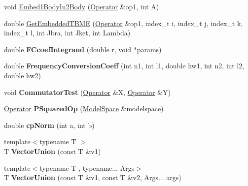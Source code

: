 \begin{DoxyCompactItemize}
\item 
void \hyperlink{namespaceimsrg__util_a4401971760847346e50bbfef08939f1e}{Embed1\+Body\+In2\+Body} (\hyperlink{classOperator}{Operator} \&op1, int A)
\item 
double \hyperlink{namespaceimsrg__util_ae46641451de4f2c5fb321e8b0a9713f8}{Get\+Embedded\+T\+B\+ME} (\hyperlink{classOperator}{Operator} \&op1, index\+\_\+t i, index\+\_\+t j, index\+\_\+t k, index\+\_\+t l, int Jbra, int Jket, int Lambda)
\item 
\mbox{\label{namespaceimsrg__util_a191c975a21423ae1a7f4e21f0ca801f1}} 
double {\bfseries F\+Ccoef\+Integrand} (double r, void $\ast$params)
\item 
\mbox{\label{namespaceimsrg__util_af9551514d7e0201c658d241c0dd49342}} 
double {\bfseries Frequency\+Conversion\+Coeff} (int n1, int l1, double hw1, int n2, int l2, double hw2)
\item 
\mbox{\label{namespaceimsrg__util_a9e733efba97a31b1f8553a9e8d6854c0}} 
void {\bfseries Commutator\+Test} (\hyperlink{classOperator}{Operator} \&X, \hyperlink{classOperator}{Operator} \&Y)
\item 
\mbox{\label{namespaceimsrg__util_abcf396767326ab630c5c6a3e497b48f8}} 
\hyperlink{classOperator}{Operator} {\bfseries P\+Squared\+Op} (\hyperlink{classModelSpace}{Model\+Space} \&modelspace)
\item 
\mbox{\label{namespaceimsrg__util_a84637262987c8f214e4e018d3c485dbe}} 
double {\bfseries cp\+Norm} (int a, int b)
\item 
\mbox{\label{namespaceimsrg__util_a6a000ce29e88102f816dd07247b2e9ed}} 
{\footnotesize template$<$typename T $>$ }\\T {\bfseries Vector\+Union} (const T \&v1)
\item 
\mbox{\label{namespaceimsrg__util_a8075125b1e2bfe4b17822a01662ed8bf}} 
{\footnotesize template$<$typename T , typename... Args$>$ }\\T {\bfseries Vector\+Union} (const T \&v1, const T \&v2, Args... args)
\end{DoxyCompactItemize}


